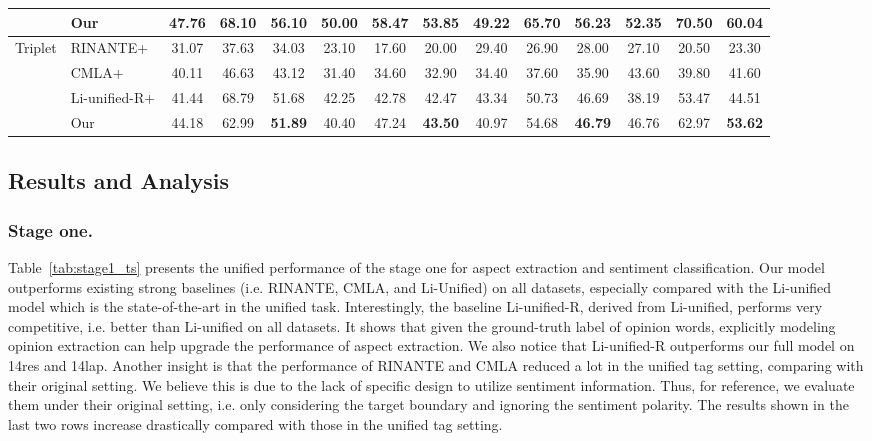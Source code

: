 \documentclass[letterpaper]{article} \usepackage{aaai20}  \usepackage{times}  \usepackage{helvet} \usepackage{courier}  \usepackage[hyphens]{url}  \usepackage{graphicx} \urlstyle{rm} \def\UrlFont{\rm}  \usepackage{graphicx}  \frenchspacing  \setlength{\pdfpagewidth}{8.5in}  \setlength{\pdfpageheight}{11in}
\begin{document}
\begin{table*}[t]
\begin{small}
\begin{tabular}{c|l|ccc|ccc|ccc|ccc}
                         & Our           & 47.76 & 68.10 & \textbf{56.10}          & 50.00 & 58.47 & \textbf{53.85} & 49.22 & 65.70 & 56.23          & 52.35 & 70.50 & \textbf{60.04} \\ \hline
\multirow{4}{*}{Triplet} & RINANTE+      & 31.07 & 37.63 & 34.03          & 23.10 & 17.60 & 20.00          & 29.40 & 26.90 & 28.00          & 27.10 & 20.50 & 23.30          \\ \cline{2-2}
                         & CMLA+         & 40.11 & 46.63 & 43.12          & 31.40 & 34.60 & 32.90          & 34.40 & 37.60 & 35.90          & 43.60 & 39.80 & 41.60          \\ \cline{2-2}
                         & Li-unified-R+ & 41.44 & 68.79 & 51.68 & 42.25 & 42.78 & 42.47          & 43.34 & 50.73 & 46.69          & 38.19 & 53.47 & 44.51          \\ \cline{2-2}
                         & Our           & 44.18 & 62.99 & \textbf{51.89}          & 40.40 & 47.24 & \textbf{43.50} & 40.97 & 54.68 & \textbf{46.79} & 46.76 & 62.97 & \textbf{53.62} \\ \hline
\end{tabular}





\end{small}

\end{table*}





\subsection{Results and Analysis}
\subsubsection{Stage one.}
Table~\ref{tab:stage1_ts} presents the unified performance of the stage one  for aspect extraction and sentiment classification. Our  model outperforms existing strong baselines (i.e. RINANTE, CMLA, and Li-Unified) on all datasets, especially compared with the Li-unified model which is the state-of-the-art in the unified task. Interestingly, the baseline Li-unified-R, derived from Li-unified, performs very competitive, i.e. better than Li-unified on all datasets. It shows that given the ground-truth label of opinion words, explicitly modeling opinion extraction can help upgrade the performance of aspect extraction. 
We also notice that Li-unified-R outperforms our full model on 14res and 14lap. 
Another insight is that the performance of RINANTE and CMLA reduced a lot in the unified tag setting, comparing with their original setting. We believe this is due to the lack of specific design to utilize sentiment information. Thus, for reference, we evaluate them under their original setting, i.e. only considering the target boundary and ignoring the sentiment polarity. The results shown in the last two rows increase drastically compared with those in the unified tag setting.
\end{document}

